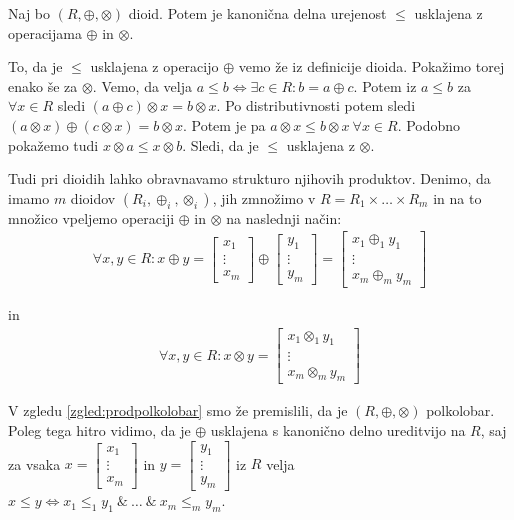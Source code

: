 \documentclass[mat1]{fmfdelo}
\begin{document}
\begin{trditev}
	Naj bo $(R, \oplus, \otimes)$ dioid. Potem je kanonična delna urejenost $\leq$ usklajena z operacijama $\oplus$ in $\otimes$.
\end{trditev}
\begin{dokaz}
	To, da je $\leq$ usklajena z operacijo $\oplus$ vemo že iz definicije dioida. Pokažimo torej enako še za $\otimes$.
	Vemo, da velja $a\leq b \iff \exists c\in R: b = a \oplus c$. Potem iz $a \leq b$ za $\forall x\in R$ sledi $(a \oplus c) \otimes x = b \otimes x$.
	Po distributivnosti potem sledi $(a\otimes x) \oplus (c \otimes x) = b\otimes x$. Potem je pa $a\otimes x \leq b\otimes x ~\forall x\in R$. Podobno pokažemo tudi $x \otimes a \leq x \otimes b$. Sledi, da je $\leq$ usklajena z $\otimes$.
\end{dokaz}

Tudi pri dioidih lahko obravnavamo strukturo njihovih produktov. Denimo, da imamo $m$ dioidov $(R_{i}, \oplus_{i}, \otimes_{i})$, jih zmnožimo v $R = R_1 \times \ldots \times R_m$ in na to množico vpeljemo operaciji $\oplus$ in $\otimes$ na naslednji način: \begin{align*}
	\forall x, y\in R: x \oplus y = \begin{bmatrix}
		x_1 \\
		\vdots \\
		x_m
	\end{bmatrix} \oplus \begin{bmatrix}
		y_1 \\
		\vdots \\
		y_m
	\end{bmatrix} = \begin{bmatrix}
		x_1 \oplus_{1} y_1 \\
		\vdots \\
		x_m \oplus_{m} y_m
	\end{bmatrix}
\end{align*}

in \begin{align*}
	\forall x, y\in R: x \otimes y = \begin{bmatrix}
		x_1 \otimes_{1} y_1 \\
		\vdots \\
		x_m \otimes_{m} y_m
	\end{bmatrix}
\end{align*}

V zgledu \ref{zgled:prodpolkolobar} smo že premislili, da je $(R, \oplus, \otimes)$ polkolobar. Poleg tega hitro vidimo, da je $\oplus$ usklajena s kanonično delno ureditvijo na $R$, saj za vsaka $x = \begin{bmatrix} x_1 \\ \vdots \\ x_m \end{bmatrix}$ in $y = \begin{bmatrix} y_1 \\ \vdots \\ y_m \end{bmatrix}$ iz $R$ velja $x \leq y \iff x_1 \leq_1 y_1 ~\&~ \ldots ~\&~ x_m \leq_m y_m$.
\end{document}
